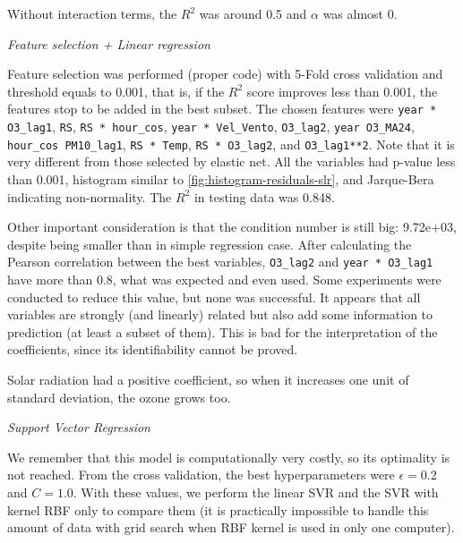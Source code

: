 \begin{remark}
    Without interaction terms, the $R^2$ was around 0.5 and $\alpha$ was
    almost 0. 
\end{remark}

\vspace{2mm}

{\em Feature selection + Linear regression}

\vspace{2mm}

Feature selection was performed (proper code) with 5-Fold cross validation and
threshold equals to 0.001, that is, if the $R^2$ score improves less than
0.001, the features stop to be added in the best subset. The chosen features
were {\tt year * O3\_lag1}, {\tt RS}, {\tt RS * hour\_cos}, {\tt year *
Vel\_Vento}, {\tt O3\_lag2}, {\tt year O3\_MA24}, {\tt hour\_cos \* PM10\_lag1},
{\tt RS * Temp}, {\tt RS * O3\_lag2}, and {\tt O3\_lag1**2}. Note that it is
very different from those selected by elastic net. All the variables had
p-value less than 0.001, histogram similar to
\ref{fig:histogram-residuals-slr}, and Jarque-Bera indicating non-normality.
The $R^2$ in testing data was 0.848. 

Other important consideration is that the condition number is still big:
9.72e+03, despite being smaller than in simple regression case. After
calculating the Pearson correlation between the best variables, {\tt O3\_lag2}
and {\tt year * O3\_lag1} have more than 0.8, what was expected and even used.
Some experiments were conducted to reduce this value, but none was successful.
It appears that all variables are strongly (and linearly) related but also
add some information to prediction (at least a subset of them). This is bad
for the interpretation of the coefficients, since its identifiability cannot
be proved.  

\begin{remark}
    Solar radiation had a positive coefficient, so when it increases one unit
    of standard deviation, the ozone grows too. 
\end{remark}

\vspace{2mm}

{\em Support Vector Regression}

\vspace{2mm}

We remember that this model is computationally very costly, so its optimality
is not reached. From the cross validation, the best hyperparameters were
$\epsilon = 0.2$ and $C = 1.0$. With these values, we perform the linear SVR and
the SVR with kernel RBF only to compare them (it is practically
impossible to handle this amount of data with grid search when RBF kernel is
used in only one computer).

